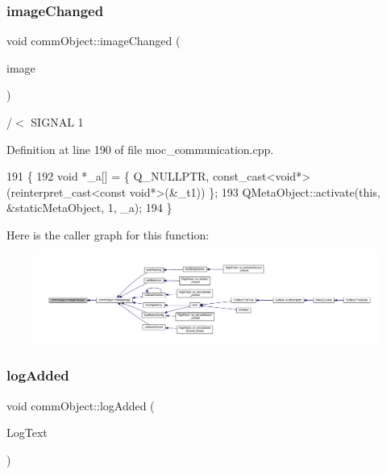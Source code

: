 \subsubsection{\texorpdfstring{image\+Changed}{imageChanged}}
{\footnotesize\ttfamily void comm\+Object\+::image\+Changed (\begin{DoxyParamCaption}\item[{Q\+Pixmap}]{image }\end{DoxyParamCaption})\hspace{0.3cm}{\ttfamily [signal]}}



/$<$ S\+I\+G\+N\+AL 1 



Definition at line 190 of file moc\+\_\+communication.\+cpp.


\begin{DoxyCode}
191 \{
192     \textcolor{keywordtype}{void} *\_a[] = \{ Q\_NULLPTR, \textcolor{keyword}{const\_cast<}\textcolor{keywordtype}{void}*\textcolor{keyword}{>}(\textcolor{keyword}{reinterpret\_cast<}\textcolor{keyword}{const }\textcolor{keywordtype}{void}*\textcolor{keyword}{>}(&\_t1)) \};
193     QMetaObject::activate(\textcolor{keyword}{this}, &staticMetaObject, 1, \_a);
194 \}
\end{DoxyCode}
Here is the caller graph for this function\+:\nopagebreak
\begin{figure}[H]
\begin{center}
\leavevmode
\includegraphics[width=350pt]{classcomm_object_a3828eab6be234f6216a6f80a6a82e41e_icgraph}
\end{center}
\end{figure}
\mbox{\label{classcomm_object_a72620fe1bac16309baf6d148644edaf9}} 
\subsubsection{\texorpdfstring{log\+Added}{logAdded}}
{\footnotesize\ttfamily void comm\+Object\+::log\+Added (\begin{DoxyParamCaption}\item[{Q\+String}]{Log\+Text }\end{DoxyParamCaption})\hspace{0.3cm}{\ttfamily [signal]}}



